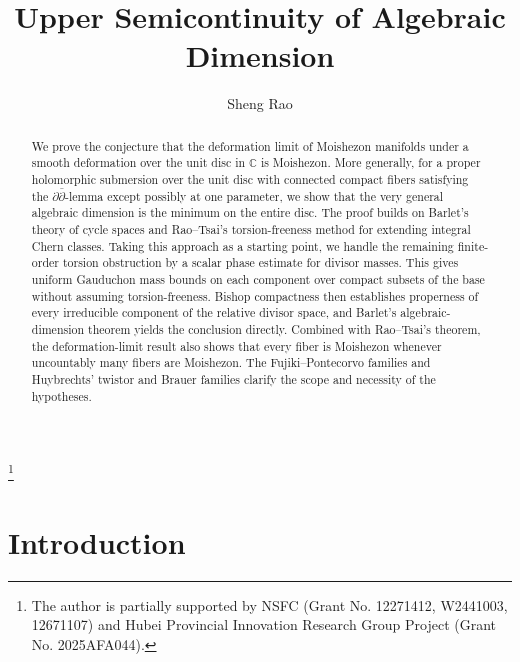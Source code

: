 \documentclass[11pt]{amsart}
\numberwithin{equation}{section}
\theoremstyle{plain}
\theoremstyle{definition}
\begin{document}
\title[Upper semicontinuity of algebraic dimension]
{Upper Semicontinuity of Algebraic Dimension}

\author{Sheng Rao}
\address{School of Mathematics and Statistics, Wuhan University, Wuhan 430072, China}
\thanks{The author is  partially supported by NSFC (Grant No. 12271412, W2441003, 12671107) and Hubei Provincial Innovation Research Group Project (Grant No. 2025AFA044).}

\date{}



\begin{abstract}
We prove the conjecture that the deformation limit of Moishezon manifolds under a smooth deformation over the unit disc in $\mathbb{C}$ is Moishezon.
More generally, for a proper holomorphic submersion over the unit disc
with connected compact fibers satisfying the $\partial\bar\partial$-lemma
except possibly at one parameter, we show that the very general algebraic
dimension is the minimum on the entire disc.
The proof builds on Barlet's theory of cycle spaces and 
Rao--Tsai's torsion-freeness method for extending integral Chern classes. Taking this approach as a starting point, we handle the
remaining finite-order torsion obstruction by a scalar phase estimate
for divisor masses.  This gives uniform Gauduchon mass bounds on each
component over compact subsets of the base without assuming
torsion-freeness.  Bishop compactness then establishes properness of
every irreducible component of the relative divisor space, and Barlet's
algebraic-dimension theorem yields the conclusion directly.
Combined with Rao--Tsai's theorem, the deformation-limit result also
shows that every fiber is Moishezon whenever uncountably many fibers
are Moishezon.
The Fujiki--Pontecorvo families and Huybrechts' twistor and Brauer families
clarify the scope and necessity of the hypotheses.
\end{abstract}

\maketitle

\setcounter{tocdepth}{1}
\tableofcontents

\section{Introduction}\label{s:introduction}
\end{document}

